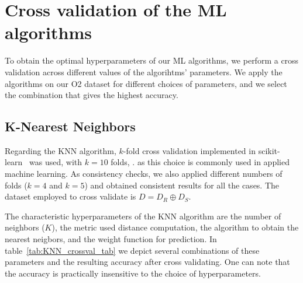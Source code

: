 \appendix

\section{Cross validation of the ML algorithms}  \label{app:crossval}

To obtain the optimal hyperparameters of our \ac{ML} algorithms, we perform a cross validation across different values of the algorihtms' parameters. We apply the algorithms on our O2 dataset for different choices of parameters, and we select the combination that gives the highest accuracy. 

\subsection{K-Nearest Neighbors}

Regarding the \ac{KNN} algorithm, $k$-fold cross validation implemented in scikit-learn~\cite{Pedregosa:2011ork} was used, with $k = 10$ folds, . as this choice is commonly used in applied machine learning. As consistency checks, we also applied different numbers of folds ($k = 4$ and $k=5$) and obtained consistent results for all the cases.  The dataset employed to cross validate is $D=D_R\oplus D_S$. 

The characteristic hyperparameters of the \ac{KNN} algorithm are the number of neighbors ($K$), the metric used distance computation, the algorithm to obtain the nearest neigbors, and the weight function for prediction. In table~\ref{tab:KNN_crossval_tab} we depict several combinations of these parameters and the resulting accuracy after cross validating. One can note that the accuracy is practically insensitive to the choice of hyperparameters.


